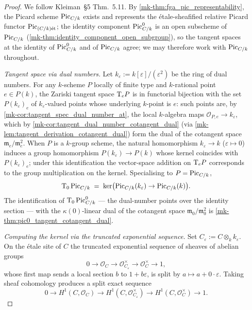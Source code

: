 \begin{proof}
  We follow Kleiman~\S 5 Thm.~5.11. By
  \ref{mk-thm:fga_pic_representability}, the Picard scheme
  \(\operatorname{Pic}_{C/k}\) exists and represents the étale-sheafified relative
  Picard functor \(\operatorname{Pic}_{(C/k)\mathrm{\acute{e}t}}\); the identity component
  \(\operatorname{Pic}^0_{C/k}\) is an open subscheme of \(\operatorname{Pic}_{C/k}\)
  (\ref{mk-thm:identity_component_open_subgroup}), so the tangent
  spaces at the identity of \(\operatorname{Pic}^0_{C/k}\) and of \(\operatorname{Pic}_{C/k}\)
  agree; we may therefore work with \(\operatorname{Pic}_{C/k}\) throughout.

  \emph{Tangent space via dual numbers.} Let
  \(k_\varepsilon := k[\varepsilon]/(\varepsilon^2)\) be the ring of
  dual numbers. For any \(k\)-scheme \(P\) locally of finite type and
  \(k\)-rational point \(e \in P(k)\), the Zariski tangent space
  \(\textup T_e P\) is in functorial bijection with the set
  \(P(k_\varepsilon)_e\) of \(k_\varepsilon\)-valued points whose
  underlying \(k\)-point is \(e\): such points are, by
  \ref{mk-cor:tangent_spec_dual_number_at}, the local
  \(k\)-algebra maps \(\mathcal O_{P,e} \to k_\varepsilon\), which by
  \ref{mk-cor:tangent_dual_number_cotangent_dual} (via
  \ref{mk-lem:tangent_derivation_cotangent_dual}) form the dual of the
  cotangent space
  \(\mathfrak m_e/\mathfrak m_e^2\). When \(P\) is a \(k\)-group scheme,
  the natural homomorphism \(k_\varepsilon \to k\) (\(\varepsilon
  \mapsto 0\)) induces a group homomorphism
  \(P(k_\varepsilon) \to P(k)\) whose kernel coincides with
  \(P(k_\varepsilon)_e\); under this identification the vector-space
  addition on \(\textup T_e P\) corresponds to the group multiplication on
  the kernel. Specialising to \(P = \operatorname{Pic}_{C/k}\),
  \[
    \textup T_0 \operatorname{Pic}_{C/k}
    \;=\; \ker\bigl(\operatorname{Pic}_{C/k}(k_\varepsilon) \to \operatorname{Pic}_{C/k}(k)\bigr).
  \]
  The identification of \(\textup T_0 \operatorname{Pic}^0_{C/k}\) — the dual-number
  points over the identity section — with the
  \(\kappa(0)\)-linear dual of the cotangent space
  \(\mathfrak m_0/\mathfrak m_0^2\) is
  \ref{mk-thm:pic0_tangent_cotangent_dual}.

  \emph{Computing the kernel via the truncated exponential sequence.}
  Set \(C_\varepsilon := C \otimes_k k_\varepsilon\). On the étale
  site of \(C\) the truncated exponential sequence of sheaves of
  abelian groups
  \[
    0 \to \mathcal{O}_C \to \mathcal{O}_{C_\varepsilon}^{\times}
        \to \mathcal{O}_C^{\times} \to 1,
  \]
  whose first map sends a local section \(b\) to \(1 + b\varepsilon\),
  is split by \(a \mapsto a + 0 \cdot \varepsilon\). Taking sheaf
  cohomology produces a split exact sequence
  \[
    0 \to H^1(C, \mathcal{O}_C)
      \to H^1(C, \mathcal{O}_{C_\varepsilon}^{\times})
      \to H^1(C, \mathcal{O}_C^{\times}) \to 1.
  \]


\end{proof}
